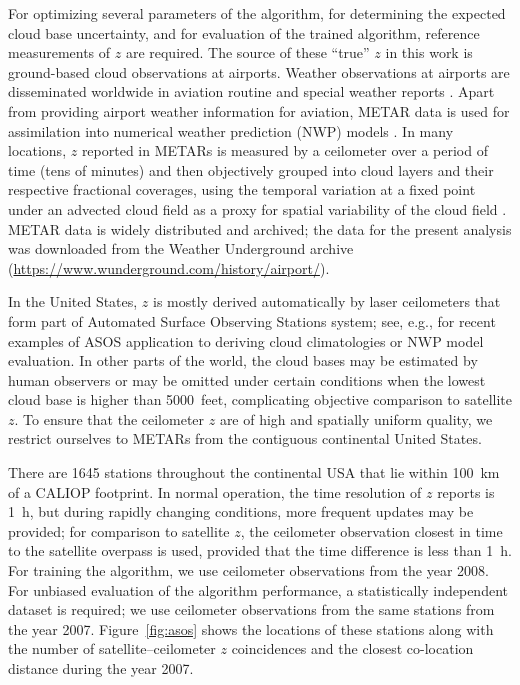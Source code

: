 \documentclass[essd,manuscript]{copernicus}\usepackage[]{graphicx}\usepackage[]{color}
\newcommand\CBH{\ensuremath{z}}
\begin{document}
For optimizing several parameters of the algorithm, for determining the expected
cloud base uncertainty, and for evaluation of the trained algorithm, reference
measurements of \CBH{} are required.  The source of these ``true'' \CBH{} in this work
is ground-based cloud observations at airports.  Weather observations at
airports are disseminated worldwide in aviation routine and special weather
reports \citep[METARs and SPECIs, collectively referred to as METARs
henceforth,][]{metar}.  Apart from providing airport weather information for
aviation, METAR data is used for assimilation into numerical weather prediction
(NWP) models \citep[e.g.,][]{Benjamin2016, Dee2011}.  In many locations, \CBH{}
reported in METARs is measured by a ceilometer over a period of time (tens of
minutes) and then objectively grouped into cloud layers and their respective
fractional coverages, using the temporal variation at a fixed point under an
advected cloud field as a proxy for spatial variability of the cloud field
\citep[e.g.,][]{Heese2010}.  METAR data is widely distributed and archived; the
data for the present analysis was downloaded from the Weather Underground
archive (\url{https://www.wunderground.com/history/airport/}).

In the United States, \CBH{} is mostly derived automatically by laser ceilometers
that form part of Automated Surface Observing Stations \citep[ASOS,][]{asos}
system; see, e.g., \cite{An2017,Ikeda2017} for recent examples of ASOS
application to deriving cloud climatologies or NWP model evaluation.  In other
parts of the world, the cloud bases may be estimated by human observers or may
be omitted under certain conditions when the lowest cloud base is higher than
5000~\unit{feet}, complicating objective comparison to satellite \CBH{}.  To ensure that
the ceilometer \CBH{} are of high and spatially uniform quality, we restrict
ourselves to METARs from the contiguous continental United States.

There are 1645 %
stations throughout the continental USA that lie within 100~km of a CALIOP
footprint.  In normal operation, the time resolution of \CBH{} reports is 1~h, but
during rapidly changing conditions, more frequent updates may be provided; for
comparison to satellite \CBH{}, the ceilometer observation closest in time to the
satellite overpass is used, provided that the time difference is less than 1~h.
For training the algorithm, we use ceilometer observations from the year 2008.
For unbiased evaluation of the algorithm performance, a statistically
independent dataset is required; we use ceilometer observations from the same
stations from the year 2007.  Figure~\ref{fig:asos} shows the locations of these
stations along with the number of satellite--ceilometer \CBH{} coincidences and the
closest co-location distance during the year 2007.
\end{document}
